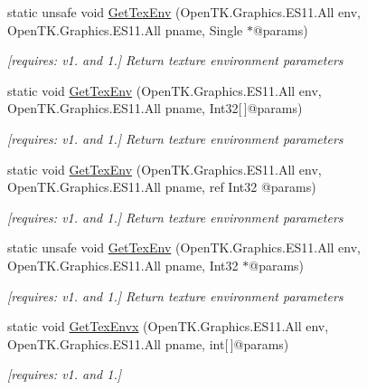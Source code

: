 \begin{DoxyCompactItemize}
static unsafe void \hyperlink{class_open_t_k_1_1_graphics_1_1_e_s11_1_1_g_l_a5eca60ec0cb1bb8cb8097057fdcdbb73}{Get\-Tex\-Env} (Open\-T\-K.\-Graphics.\-E\-S11.\-All env, Open\-T\-K.\-Graphics.\-E\-S11.\-All pname, Single $\ast$@params)
\begin{DoxyCompactList}\small\item\em \mbox{[}requires\-: v1. and 1.\mbox{]} Return texture environment parameters \end{DoxyCompactList}\item 
static void \hyperlink{class_open_t_k_1_1_graphics_1_1_e_s11_1_1_g_l_a8db02d6eb8088a1c8c9174893667bca7}{Get\-Tex\-Env} (Open\-T\-K.\-Graphics.\-E\-S11.\-All env, Open\-T\-K.\-Graphics.\-E\-S11.\-All pname, Int32\mbox{[}$\,$\mbox{]}@params)
\begin{DoxyCompactList}\small\item\em \mbox{[}requires\-: v1. and 1.\mbox{]} Return texture environment parameters \end{DoxyCompactList}\item 
static void \hyperlink{class_open_t_k_1_1_graphics_1_1_e_s11_1_1_g_l_a309e434cca6fe8a8de97abd6d26d8cfd}{Get\-Tex\-Env} (Open\-T\-K.\-Graphics.\-E\-S11.\-All env, Open\-T\-K.\-Graphics.\-E\-S11.\-All pname, ref Int32 @params)
\begin{DoxyCompactList}\small\item\em \mbox{[}requires\-: v1. and 1.\mbox{]} Return texture environment parameters \end{DoxyCompactList}\item 
static unsafe void \hyperlink{class_open_t_k_1_1_graphics_1_1_e_s11_1_1_g_l_aa5c03e6ca55c67bafc37c68442cfc884}{Get\-Tex\-Env} (Open\-T\-K.\-Graphics.\-E\-S11.\-All env, Open\-T\-K.\-Graphics.\-E\-S11.\-All pname, Int32 $\ast$@params)
\begin{DoxyCompactList}\small\item\em \mbox{[}requires\-: v1. and 1.\mbox{]} Return texture environment parameters \end{DoxyCompactList}\item 
static void \hyperlink{class_open_t_k_1_1_graphics_1_1_e_s11_1_1_g_l_a141eec70a6df6eb366669ce32123b14d}{Get\-Tex\-Envx} (Open\-T\-K.\-Graphics.\-E\-S11.\-All env, Open\-T\-K.\-Graphics.\-E\-S11.\-All pname, int\mbox{[}$\,$\mbox{]}@params)
\begin{DoxyCompactList}\small\item\em \mbox{[}requires\-: v1. and 1.\mbox{]}\end{DoxyCompactList}\item 

\end{DoxyCompactItemize}
